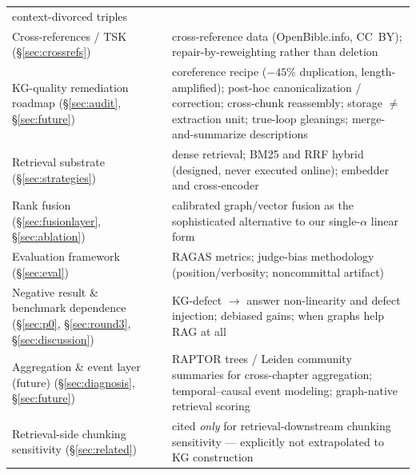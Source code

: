 \begin{table}[!t]
\begin{threeparttable}
\begin{tabular}{@{}p{3.5cm}p{4.1cm}p{9.2cm}@{}}
context-divorced triples \\
\addlinespace
Cross-references / TSK (\S\ref{sec:crossrefs}) &
\cite{tsk,zheng2025lessismore} &
cross-reference data (OpenBible.info, CC~BY); repair-by-reweighting
rather than deletion \\
\addlinespace
KG-quality remediation roadmap (\S\ref{sec:audit}, \S\ref{sec:future}) &
\cite{meher2025linkkg,zhang2024edc,loconte2026betterlater,zhang2025rakg,zhang2026crossaug,neo4jbuilder,nanographrag,guo2024lightrag} &
coreference recipe ($-45\%$ duplication, length-amplified); post-hoc
canonicalization / correction; cross-chunk reassembly; storage
$\ne$ extraction unit; true-loop gleanings; merge-and-summarize
descriptions \\
\addlinespace
Retrieval substrate (\S\ref{sec:strategies}) &
\cite{karpukhin2020dpr,robertson2009bm25,cormack2009rrf,chen2024bgem3} &
dense retrieval; BM25 and RRF hybrid (designed, never executed online);
embedder and cross-encoder \\
\addlinespace
Rank fusion (\S\ref{sec:fusionlayer}, \S\ref{sec:ablation}) &
\cite{bacellar2026calibrated} &
calibrated graph/vector fusion as the sophisticated alternative to our
single-$\alpha$ linear form \\
\addlinespace
Evaluation framework (\S\ref{sec:eval}) &
\cite{es2023ragas,zeng2025unbiased} &
RAGAS metrics; judge-bias methodology (position/verbosity;
noncommittal artifact) \\
\addlinespace
Negative result \& benchmark dependence (\S\ref{sec:p0},
\S\ref{sec:round3}, \S\ref{sec:discussion}) &
\cite{zhou2025brink,zeng2025unbiased,xiang2025whengraphs} &
KG-defect $\to$ answer non-linearity and defect injection; debiased
gains; when graphs help RAG at all \\
\addlinespace
Aggregation \& event layer (future) (\S\ref{sec:diagnosis},
\S\ref{sec:future}) &
\cite{sarthi2024raptor,edge2024graphrag,traag2019leiden,lairgi2025atom,zhang2025entityevent,sun2025dygrag,gutierrez2025hipporag2,wang2025archrag} &
RAPTOR trees / Leiden community summaries for cross-chapter
aggregation; temporal--causal event modeling; graph-native retrieval
scoring \\
\addlinespace
Retrieval-side chunking sensitivity (\S\ref{sec:related}) &
\cite{shaukat2026chunking} &
cited \emph{only} for retrieval-downstream chunking sensitivity ---
explicitly not extrapolated to KG construction \\
\bottomrule
\end{tabular}
\end{threeparttable}
\end{table}

